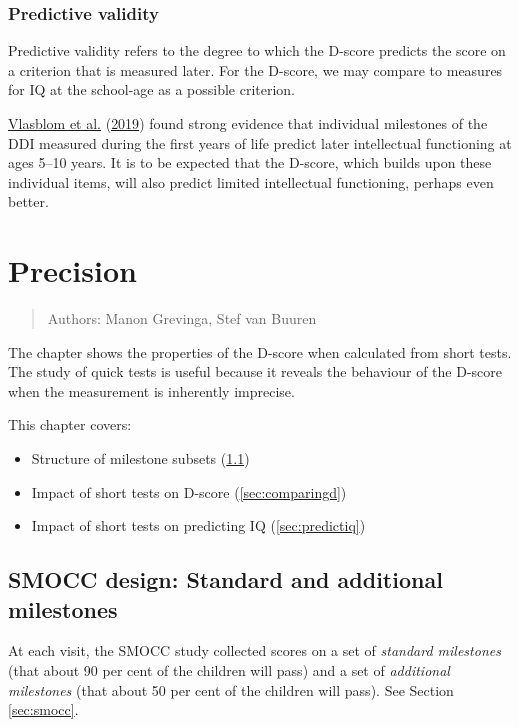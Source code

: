 \documentclass[
]{book}
\providecommand{\tightlist}{%
  \setlength{\itemsep}{0pt}\setlength{\parskip}{0pt}}
\begin{document}
\hypertarget{predictive-validity}{%
\subsection{Predictive validity}\label{predictive-validity}}

Predictive validity refers to the degree to which the D-score predicts the score on a criterion that is measured later. For the D-score, we may compare to measures for IQ at the school-age as a possible criterion.

\protect\hyperlink{ref-vlasblom2019}{Vlasblom et al.} (\protect\hyperlink{ref-vlasblom2019}{2019}) found strong evidence that individual milestones of the DDI measured during the first years of life predict later intellectual functioning at ages 5--10 years. It is to be expected that the D-score, which builds upon these individual items, will also predict limited intellectual functioning, perhaps even better.

\hypertarget{ch:precision}{%
\chapter{Precision}\label{ch:precision}}

\begin{quote}
Authors: Manon Grevinga, Stef van Buuren
\end{quote}

The chapter shows the properties of the D-score when calculated from short tests. The study of quick tests is useful because it reveals the behaviour of the D-score when the measurement is inherently imprecise.

This chapter covers:

\begin{itemize}
\tightlist
\item
  Structure of milestone subsets (\ref{sec:smoccmilestones})
\item
  Impact of short tests on D-score (\ref{sec:comparingd})
\item
  Impact of short tests on predicting IQ (\ref{sec:predictiq})
\end{itemize}

\hypertarget{sec:smoccmilestones}{%
\section{SMOCC design: Standard and additional milestones}\label{sec:smoccmilestones}}

At each visit, the SMOCC study collected scores on a set of \emph{standard milestones} (that about 90 per cent of the children will pass) and a set of \emph{additional milestones} (that about 50 per cent of the children will pass). See Section \ref{sec:smocc}.
\end{document}
